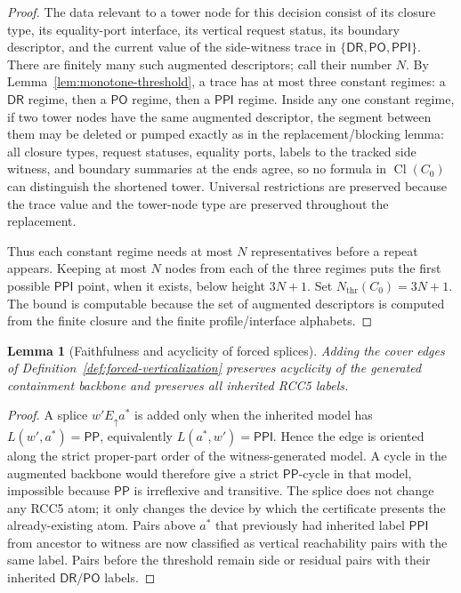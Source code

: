 \documentclass[11pt]{article}
\newtheorem{lemma}[theorem]{Lemma}
\newcommand{\DR}{\mathsf{DR}}
\newcommand{\PO}{\mathsf{PO}}
\newcommand{\PP}{\mathsf{PP}}
\newcommand{\PPI}{\mathsf{PPI}}
\newcommand{\Cl}{\operatorname{Cl}}
\begin{document}
\begin{proof}
The data relevant to a tower node for this decision consist of its closure type, its equality-port interface, its vertical request status, its boundary descriptor, and the current value of the side-witness trace in $\{\DR,\PO,\PPI\}$.  There are finitely many such augmented descriptors; call their number $N$.  By Lemma~\ref{lem:monotone-threshold}, a trace has at most three constant regimes: a $\DR$ regime, then a $\PO$ regime, then a $\PPI$ regime.  Inside any one constant regime, if two tower nodes have the same augmented descriptor, the segment between them may be deleted or pumped exactly as in the replacement/blocking lemma: all closure types, request statuses, equality ports, labels to the tracked side witness, and boundary summaries at the ends agree, so no formula in $\Cl(C_0)$ can distinguish the shortened tower.  Universal restrictions are preserved because the trace value and the tower-node type are preserved throughout the replacement.

Thus each constant regime needs at most $N$ representatives before a repeat appears.  Keeping at most $N$ nodes from each of the three regimes puts the first possible $\PPI$ point, when it exists, below height $3N+1$.  Set $N_\mathrm{thr}(C_0)=3N+1$.  The bound is computable because the set of augmented descriptors is computed from the finite closure and the finite profile/interface alphabets.
\end{proof}

\begin{lemma}[Faithfulness and acyclicity of forced splices]\label{lem:splice-faithful}
Adding the cover edges of Definition~\ref{def:forced-verticalization} preserves acyclicity of the generated containment backbone and preserves all inherited RCC5 labels.
\end{lemma}

\begin{proof}
A splice $w'E_{\uparrow}a^*$ is added only when the inherited model has $L(w',a^*)=\PP$, equivalently $L(a^*,w')=\PPI$.  Hence the edge is oriented along the strict proper-part order of the witness-generated model.  A cycle in the augmented backbone would therefore give a strict $\PP$-cycle in that model, impossible because $\PP$ is irreflexive and transitive.  The splice does not change any RCC5 atom; it only changes the device by which the certificate presents the already-existing atom.  Pairs above $a^*$ that previously had inherited label $\PPI$ from ancestor to witness are now classified as vertical reachability pairs with the same label.  Pairs before the threshold remain side or residual pairs with their inherited $\DR/\PO$ labels.
\end{proof}
\end{document}
